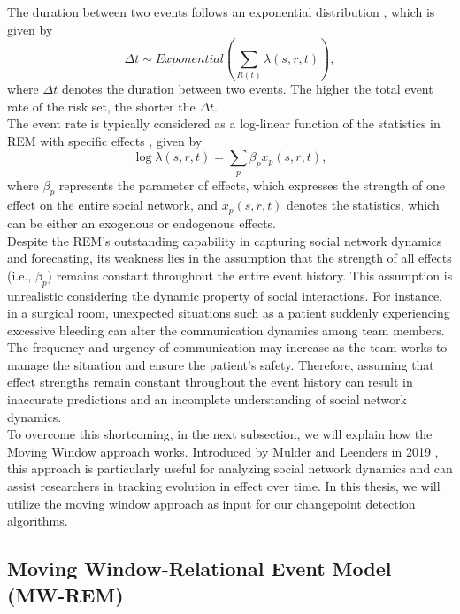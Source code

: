\documentclass[]{interact}
\theoremstyle{plain}%
\theoremstyle{definition}
\theoremstyle{remark}
\begin{document}
	The duration between two events follows an exponential distribution \cite{buttsRelationalEventFramework2008}, which is given by
	\begin{equation} \label{2}
		\Delta t \sim Exponential \left(\sum_{R(t)} \lambda(s,r,t) \right),
	\end{equation}
	where $\Delta t$ denotes the duration between two events. The higher the total event rate of the risk set, the shorter the $\Delta t$. \\
	
	The event rate is typically considered as a log-linear function of the statistics in REM with specific effects \cite{buttsRelationalEventFramework2008}, given by
	\begin{equation} \label{3}
		\log \lambda(s,r,t) = \sum_{p} \beta_p x_p(s,r,t),
	\end{equation}
	where $\beta_p$ represents the parameter of effects, which expresses the strength of one effect on the entire social network, and $x_p(s,r,t)$ denotes the statistics, which can be either an exogenous or endogenous effects. \\
	
	Despite the REM's outstanding capability in capturing social network dynamics and forecasting, its weakness lies in the assumption that the strength of all effects (i.e., $\beta_p$) remains constant throughout the entire event history. This assumption is unrealistic considering the dynamic property of social interactions. For instance, in a surgical room, unexpected situations such as a patient suddenly experiencing excessive bleeding can alter the communication dynamics among team members. The frequency and urgency of communication may increase as the team works to manage the situation and ensure the patient's safety. Therefore, assuming that effect strengths remain constant throughout the event history can result in inaccurate predictions and an incomplete understanding of social network dynamics. \\
	
	To overcome this shortcoming, in the next subsection, we will explain how the Moving Window approach works. Introduced by Mulder and Leenders in 2019 \cite{mulderModelingEvolutionInteraction2019}, this approach is particularly useful for analyzing social network dynamics and can assist researchers in tracking evolution in effect over time. In this thesis, we will utilize the moving window approach as input for our changepoint detection algorithms.
	
	\subsection{Moving Window-Relational Event Model (MW-REM)} \label{sec:MW-REM}
	
\end{document}
